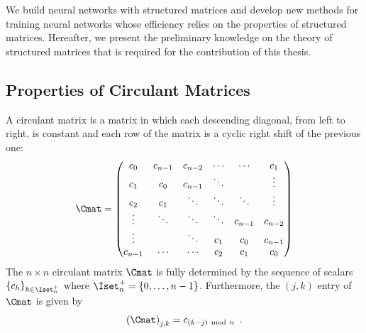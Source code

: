  


We build neural networks with structured matrices and develop new methods for training neural networks whose efficiency relies on the properties of structured matrices. 
Hereafter, we present the preliminary knowledge on the theory of structured matrices that is required for the contribution of this thesis. 


\subsection{Properties of Circulant Matrices}
\label{subsection:ch2-properties_of_circulant_matrices}

A circulant matrix is a matrix in which each descending diagonal, from left to right, is constant and each row of the matrix is a cyclic right shift of the previous one:
\begin{equation}
  \Cmat =
  \leftmatrix
    c_0 & c_{n-1} & c_{n-2} & \cdots & \cdots & c_{1} \\
    c_{1} & c_0 & c_{n-1} & \ddots & & \vdots \\
    c_{2} & c_{1} & \ddots & \ddots & \ddots & \vdots \\
    \vdots & \ddots & \ddots & \ddots & c_{n-1} & c_{n-2} \\
    \vdots & & \ddots & c_{1} & c_{0} & c_{n-1} \\
    c_{n-1} & \cdots & \cdots & c_{2} & c_{1} & c_0
  \rightmatrix
\end{equation}
\noindent
The $n \times n$ circulant matrix $\Cmat$ is fully determined by the sequence of scalars $\{c_h\}_{h \in \Iset^+_n}$ where $\Iset^+_n= \{0, \ldots, n-1\}$.
Furthermore, the $(j,k)$ entry of $\Cmat$ is given by
\begin{equation}
  \leftmat \Cmat \rightmat_{j,k} = c_{\left(k-j\right) \mod n} \enspace.
\end{equation}



